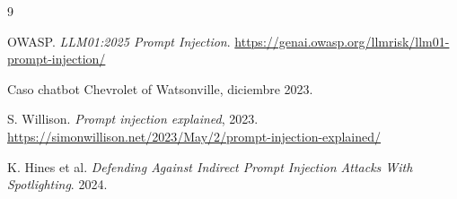 \documentclass[11pt]{article}
\begin{document}
\begin{thebibliography}{9}

OWASP. \emph{LLM01:2025 Prompt Injection}.
\url{https://genai.owasp.org/llmrisk/llm01-prompt-injection/}

Caso chatbot Chevrolet of Watsonville, diciembre 2023.

S. Willison. \emph{Prompt injection explained}, 2023.
\url{https://simonwillison.net/2023/May/2/prompt-injection-explained/}

K. Hines et al. \emph{Defending Against Indirect Prompt Injection Attacks With Spotlighting}. 2024.

\end{thebibliography}
\end{document}

